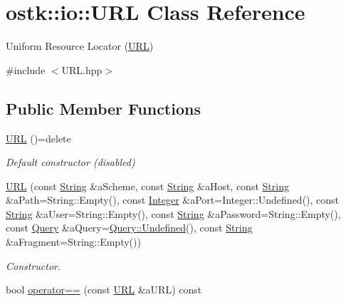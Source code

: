 \hypertarget{classostk_1_1io_1_1_u_r_l}{}\section{ostk\+:\+:io\+:\+:U\+RL Class Reference}
\label{classostk_1_1io_1_1_u_r_l}


Uniform Resource Locator (\hyperlink{classostk_1_1io_1_1_u_r_l}{U\+RL})  




{\ttfamily \#include $<$U\+R\+L.\+hpp$>$}

\subsection*{Public Member Functions}
\begin{DoxyCompactItemize}
\item 
\hyperlink{classostk_1_1io_1_1_u_r_l_a2537e046cef4ac966cc295abb81279c2}{U\+RL} ()=delete
\begin{DoxyCompactList}\small\item\em Default constructor (disabled) \end{DoxyCompactList}\item 
\hyperlink{classostk_1_1io_1_1_u_r_l_a5a24386372bb8c71e9314c003058b22f}{U\+RL} (const \hyperlink{namespaceostk_1_1io_a95d49b120613a7610cb1b4f03b1116b6}{String} \&a\+Scheme, const \hyperlink{namespaceostk_1_1io_a95d49b120613a7610cb1b4f03b1116b6}{String} \&a\+Host, const \hyperlink{namespaceostk_1_1io_a95d49b120613a7610cb1b4f03b1116b6}{String} \&a\+Path=String\+::\+Empty(), const \hyperlink{namespaceostk_1_1io_a35328f680550d000b2754860bbe1d268}{Integer} \&a\+Port=Integer\+::\+Undefined(), const \hyperlink{namespaceostk_1_1io_a95d49b120613a7610cb1b4f03b1116b6}{String} \&a\+User=String\+::\+Empty(), const \hyperlink{namespaceostk_1_1io_a95d49b120613a7610cb1b4f03b1116b6}{String} \&a\+Password=String\+::\+Empty(), const \hyperlink{namespaceostk_1_1io_aeabc644ba5c25896df8014bd0271f970}{Query} \&a\+Query=\hyperlink{classostk_1_1io_1_1url_1_1_query_a25f41e04f41e40fd63519e377829323f}{Query\+::\+Undefined}(), const \hyperlink{namespaceostk_1_1io_a95d49b120613a7610cb1b4f03b1116b6}{String} \&a\+Fragment=String\+::\+Empty())
\begin{DoxyCompactList}\small\item\em Constructor. \end{DoxyCompactList}\item 
bool \hyperlink{classostk_1_1io_1_1_u_r_l_a46fed221d83ea9a6985b079ee6d6f151}{operator==} (const \hyperlink{classostk_1_1io_1_1_u_r_l}{U\+RL} \&a\+U\+RL) const

\end{DoxyCompactItemize}
